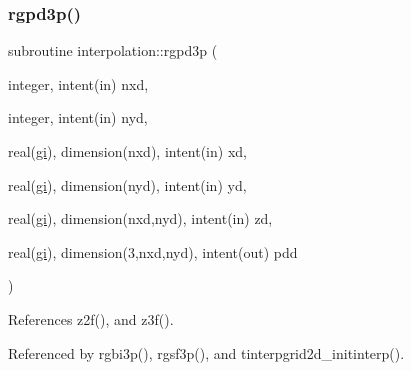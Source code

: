 \subsubsection{\texorpdfstring{rgpd3p()}{rgpd3p()}}
{\footnotesize\ttfamily subroutine interpolation\+::rgpd3p (\begin{DoxyParamCaption}\item[{integer, intent(in)}]{nxd,  }\item[{integer, intent(in)}]{nyd,  }\item[{real(\mbox{\hyperlink{namespaceinterpolation_a7242dea48715e8170bae81efe12c64be}{gi}}), dimension(nxd), intent(in)}]{xd,  }\item[{real(\mbox{\hyperlink{namespaceinterpolation_a7242dea48715e8170bae81efe12c64be}{gi}}), dimension(nyd), intent(in)}]{yd,  }\item[{real(\mbox{\hyperlink{namespaceinterpolation_a7242dea48715e8170bae81efe12c64be}{gi}}), dimension(nxd,nyd), intent(in)}]{zd,  }\item[{real(\mbox{\hyperlink{namespaceinterpolation_a7242dea48715e8170bae81efe12c64be}{gi}}), dimension(3,nxd,nyd), intent(out)}]{pdd }\end{DoxyParamCaption})}



References z2f(), and z3f().



Referenced by rgbi3p(), rgsf3p(), and tinterpgrid2d\+\_\+initinterp().

